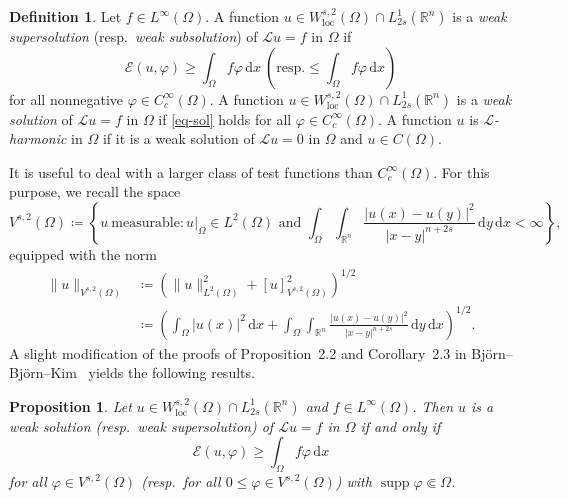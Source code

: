 \documentclass[11pt]{amsart}
\theoremstyle{plain}
\newtheorem{proposition}[theorem]{Proposition}
\theoremstyle{definition}
\newtheorem{definition}[theorem]{Definition}
\numberwithin{equation}{section}
\DeclareMathOperator{\supp}{supp}
\begin{document}
\begin{definition}\label{def-harmonic}
Let $f \in L^\infty(\Omega)$. A function $u \in W^{s, 2}_{\mathrm{loc}}(\Omega) \cap L^{1}_{2s}(\mathbb{R}^n)$ is a {\it weak supersolution} (resp.\ \emph{weak subsolution}) of $\mathcal{L}u=f$ in $\Omega$ if
\begin{equation}\label{eq-sol}
\mathcal{E}(u, \varphi) \geq \int_\Omega f\varphi \,\mathrm{d}x ~\left(\text{resp.} \leq  \int_\Omega f\varphi \,\mathrm{d}x\right)
\end{equation}
for all nonnegative $\varphi \in C^\infty_c(\Omega)$. A function $u \in W^{s, 2}_{\mathrm{loc}}(\Omega) \cap L^{1}_{2s}(\mathbb{R}^n)$ is a {\it weak solution} of $\mathcal{L}u=f$ in $\Omega$ if \eqref{eq-sol} holds for all $\varphi \in C^\infty_c(\Omega)$. A function $u$ is \emph{$\mathcal{L}$-harmonic} in $\Omega$ if it is a weak solution of $\mathcal{L}u=0$ in $\Omega$ and $u \in C(\Omega)$.
\end{definition}

It is useful to deal with a larger class of test functions than $C^\infty_c(\Omega)$. For this purpose, we recall the space
\begin{equation*}
V^{s, 2}(\Omega) \coloneqq \left\{ u~\text{measurable}: u|_\Omega \in L^2(\Omega) \text{ and } \int_{\Omega} \int_{\mathbb{R}^n} \frac{|u(x)-u(y)|^2}{|x-y|^{n+2s}} \,\mathrm{d}y \,\mathrm{d}x < \infty \right\},
\end{equation*}
equipped with the norm
\begin{align*}
\|u\|_{V^{s, 2}(\Omega)}
&\coloneqq \left( \|u\|_{L^2(\Omega)}^2 + [u]_{V^{s, 2}(\Omega)}^2 \right)^{1/2} \\
&\coloneqq \left( \int_\Omega |u(x)|^2 \,\mathrm{d}x + \int_\Omega \int_{\mathbb{R}^n} \frac{|u(x)-u(y)|^2}{|x-y|^{n+2s}} \,\mathrm{d}y\,\mathrm{d}x \right)^{1/2}.
\end{align*}
A slight modification of the proofs of Proposition~2.2 and Corollary~2.3 in Bj\"orn--Bj\"orn--Kim~\cite{BBK24} yields the following results.

\begin{proposition}\label{prop-test-V}
Let $u \in W^{s, 2}_{\mathrm{loc}}(\Omega) \cap L^1_{2s}(\mathbb{R}^n)$ and $f \in L^\infty(\Omega)$. Then $u$ is a weak solution \textup{(}resp.\ weak supersolution\textup{)} of $\mathcal{L}u=f$ in $\Omega$ if and only if
\begin{equation*}
\mathcal{E}(u, \varphi) \geq \int_{\Omega} f \varphi \,\mathrm{d}x
\end{equation*}
for all $\varphi \in V^{s, 2}(\Omega)$ \textup{(}resp.\ for all $0 \leq \varphi \in V^{s, 2}(\Omega)$\textup{)} with $\supp\varphi \Subset \Omega$.
\end{proposition}
\end{document}
